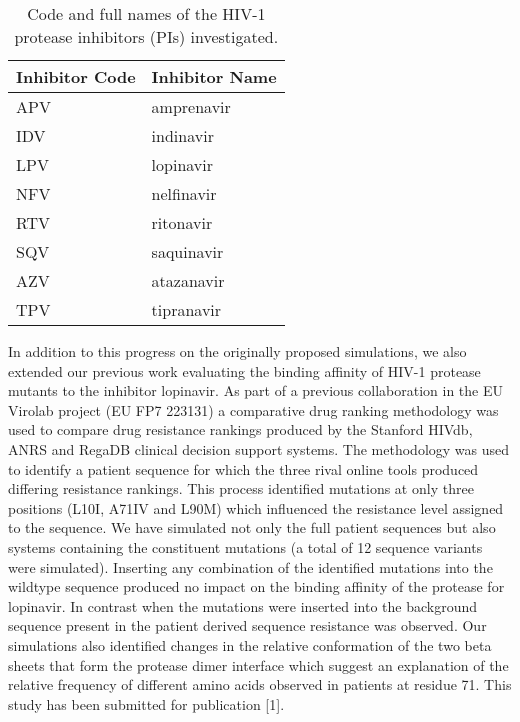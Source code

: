 \documentclass[a4paper,12pt]{article}
\begin{document}
\begin{table}
\begin{center}
\begin{tabular}{l l}
\textbf{Inhibitor Code} & \textbf{Inhibitor Name}\\
\hline
APV & amprenavir\\
IDV & indinavir\\
LPV & lopinavir\\
NFV & nelfinavir\\
RTV & ritonavir\\
SQV & saquinavir\\
AZV & atazanavir \\
TPV & tipranavir \\
\hline
\end{tabular}
\end{center}
\caption{Code and full names of the HIV-1 protease inhibitors (PIs) investigated.}
\label{tab:inhibitors}
\end{table}

In addition to this progress on the originally proposed simulations, we also extended our previous work 
evaluating the binding affinity of HIV-1 protease mutants to the inhibitor lopinavir. As part of 
a previous collaboration in the EU Virolab project (EU FP7 223131) a comparative drug ranking 
methodology was used to compare drug resistance rankings produced by the Stanford HIVdb, ANRS 
and RegaDB clinical decision support systems. The methodology was used to identify a patient 
sequence for which the three rival online tools produced differing resistance rankings. This process 
identified mutations at only three positions (L10I, A71IV and L90M) which influenced the resistance 
level assigned to the sequence. We have simulated not only the full patient sequences but also 
systems containing the constituent mutations (a total of 12 sequence variants were simulated). 
Inserting any combination of the identified mutations into the wildtype sequence produced no impact 
on the binding affinity of the protease for lopinavir. In contrast when the mutations were inserted 
into the background sequence present in the patient derived sequence resistance was observed. Our 
simulations also identified changes in the relative conformation of the two beta sheets that form 
the protease dimer interface which suggest an explanation of the relative frequency of different 
amino acids observed in patients at residue 71. This study has been submitted for publication [1].
\end{document}
